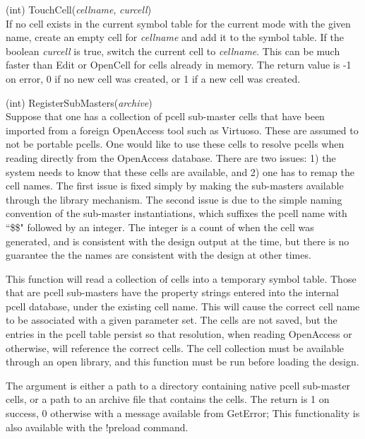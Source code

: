 \begin{description}
\item{(int) \vt TouchCell({\it cellname\/}, {\it curcell\/})}\\
If no cell exists in the current symbol table for the current mode
with the given name, create an empty cell for {\it cellname} and add
it to the symbol table.  If the boolean {\it curcell} is true, switch
the current cell to {\it cellname}.  This can be much faster than {\vt
Edit} or {\vt OpenCell} for cells already in memory.  The return value
is -1 on error, 0 if no new cell was created, or 1 if a new cell was
created.

\item{(int) \vt RegisterSubMasters({\it archive\/})}\\
Suppose that one has a collection of pcell sub-master {\Xic} cells
that have been imported from a foreign OpenAccess tool such as
Virtuoso.  These are assumed to not be portable pcells.  One would
like to use these cells to resolve pcells when reading directly from
the OpenAccess database.  There are two issues:  1) the system needs
to know that these cells are available, and 2) one has to remap the
cell names.  The first issue is fixed simply by making the sub-masters
available through the library mechanism.  The second issue is due to
the simple naming convention of the sub-master instantiations, which
suffixes the pcell name with ``{\vt \$\$}" followed by an integer. 
The integer is a count of when the cell was generated, and is
consistent with the design output at the time, but there is no
guarantee the the names are consistent with the design at other times.

This function will read a collection of cells into a temporary symbol
table.  Those that are pcell sub-masters have the property strings
entered into the internal pcell database, under the existing cell
name.  This will cause the correct cell name to be associated with a
given parameter set.  The cells are not saved, but the entries in the
pcell table persist so that resolution, when reading OpenAccess or
otherwise, will reference the correct cells.  The cell collection must
be available through an open library, and this function must be run
before loading the design.

The argument is either a path to a directory containing native pcell
sub-master cells, or a path to an archive file that contains the
cells.  The return is 1 on success, 0 otherwise with a message
available from {\vt GetError}; This functionality is also available
with the {\cb !preload} command.


\end{description}
